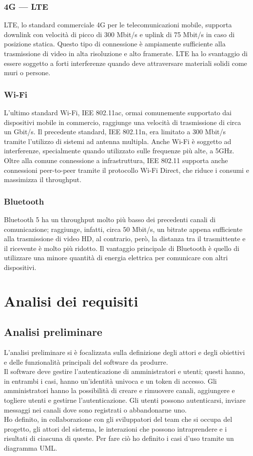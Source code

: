 		\subsubsection{4G --- LTE}
			LTE, lo standard commerciale 4G per le telecomunicazioni mobile, supporta downlink con velocità di picco di 300 Mbit/s e uplink di 75 Mbit/s in caso di posizione statica. Questo tipo di connessione è ampiamente sufficiente alla trasmissione di video in alta risoluzione e alto framerate. LTE ha lo svantaggio di essere soggetto a forti interferenze quando deve attraversare materiali solidi come muri o persone.
		\subsubsection{Wi-Fi}
			L'ultimo standard Wi-Fi, IEE 802.11ac, ormai comunemente supportato dai dispositivi mobile in commercio, raggiunge una velocità di trasmissione di circa un Gbit/s. Il precedente standard, IEE 802.11n, era limitato a 300 Mbit/s tramite l'utilizzo di sistemi ad antenna multipla. Anche Wi-Fi è soggetto ad interferenze, specialmente quando utilizzato sulle frequenze più alte, a 5GHz. Oltre alla comune connessione a infrastruttura, IEE 802.11 supporta anche connessioni peer-to-peer tramite il protocollo Wi-Fi Direct, che riduce i consumi e massimizza il throughput.
		\subsubsection{Bluetooth}
			Bluetooth 5 ha un throughput molto più basso dei precedenti canali di comunicazione; raggiunge, infatti, circa 50 Mbit/s, un bitrate appena sufficiente alla trasmissione di video HD, al contrario, però, la distanza tra il trasmittente e il ricevente è molto più ridotto. Il vantaggio principale di Bluetooth è quello di utilizzare una minore quantità di energia elettrica per comunicare con altri dispositivi.

\section{Analisi dei requisiti}
	\subsection{Analisi preliminare}
		L'analisi preliminare si è focalizzata sulla definizione degli attori e degli obiettivi e delle funzionalità principali del software da produrre.
		\\
		Il software deve gestire l'autenticazione di amministratori e utenti; questi hanno, in entrambi i casi, hanno un'identità univoca e un token di accesso. Gli amministratori hanno la possibilità di creare e rimuovere canali, aggiungere e togliere utenti e gestirne l'autenticazione.
		Gli utenti possono autenticarsi, inviare messaggi nei canali dove sono registrati o abbandonarne uno.
		\\
		Ho definito, in collaborazione con gli sviluppatori del team che si occupa del progetto, gli attori del sistema, le interazioni che possono intraprendere e i risultati di ciascuna di queste. Per fare ciò ho definito i casi d'uso tramite un diagramma UML.\@


